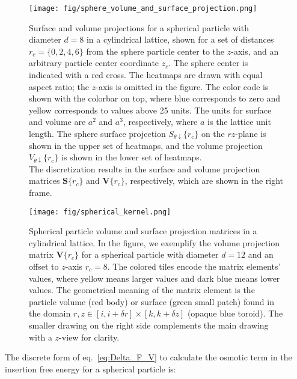 \documentclass[10pt, a4paper]{article}
\begin{document}
\begin{multicols}{2}
\begin{figure}[H]
    \centering
    \texttt{[image: fig/sphere\_volume\_and\_surface\_projection.png]}
    \caption{
        Surface and volume projections for a spherical particle with diameter $d = 8$ in a cylindrical lattice, shown for a set of distances $r_c = \{0, 2, 4, 6\}$ from the sphere particle center to the $z$-axis, and an arbitrary particle center coordinate $z_c$.
        The sphere center is indicated with a red cross.
        The heatmaps are drawn with equal aspect ratio; the $z$-axis is omitted in the figure.
        The color code is shown with the colorbar on top, where blue corresponds to zero and yellow corresponds to values above 25 units.
        The units for surface and volume are $a^2$ and $a^3$, respectively, where $a$ is the lattice unit length.
        The sphere surface projection $S_{\theta \downarrow}\{r_c\}$ on the $rz$-plane is shown in the upper set of heatmaps, and the volume projection $V_{\theta \downarrow}\{r_c\}$ is shown in the lower set of heatmaps.
        \\
        The discretization results in the surface and volume projection matrices $\bm{S}\{r_c\}$ and $\bm{V}\{r_c\}$, respectively, which are shown in the right frame.
    }
    \label{fig:sphere_volume_and_surface_projection}
\end{figure}


\begin{figure}[H]
    \centering
    \texttt{[image: fig/spherical\_kernel.png]}
    \caption{
        Spherical particle volume and surface projection matrices in a cylindrical lattice.
        In the figure, we exemplify the volume projection matrix $\bm{V}\{r_c\}$ for a spherical particle with diameter $d = 12$ and an offset to $z$-axis $r_c= 8$.
        The colored tiles encode the matrix elements' values, where yellow means larger values and dark blue means lower values.
        The geometrical meaning of the matrix element is the particle volume (red body) or surface (green small patch) found in the domain $r,z \in [i, i + \delta r] \times [k, k + \delta z]$ (opaque blue toroid).
        The smaller drawing on the right side complements the main drawing with a $z$-view for clarity.
    }
    \label{fig:spherical_kernel}
\end{figure}

The discrete form of eq.~\ref{eq:Delta_F_V} to calculate the osmotic term in the insertion free energy for a spherical particle is:


\end{multicols}
\end{document}
